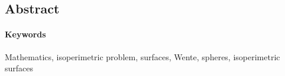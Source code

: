 \begin{otherlanguage}{american}
\section{Abstract}



\paragraph{Keywords} Mathematics, isoperimetric problem, surfaces, Wente, spheres, isoperimetric surfaces

\end{otherlanguage}
